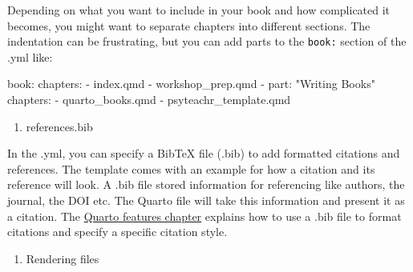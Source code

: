 \documentclass[
  letterpaper,
  DIV=11,
  numbers=noendperiod]{scrreprt}
\newenvironment{Shaded}{\begin{snugshade}}{\end{snugshade}}
\newcommand{\NormalTok}[1]{\textcolor[rgb]{0.00,0.23,0.31}{#1}}
\newcommand{\SpecialCharTok}[1]{\textcolor[rgb]{0.37,0.37,0.37}{#1}}
\newcommand{\StringTok}[1]{\textcolor[rgb]{0.13,0.47,0.30}{#1}}
\providecommand{\tightlist}{%
  \setlength{\itemsep}{0pt}\setlength{\parskip}{0pt}}\usepackage{longtable,booktabs,array}
\begin{document}
\begin{tcolorbox}[enhanced jigsaw, colbacktitle=quarto-callout-tip-color!10!white, titlerule=0mm, leftrule=.75mm, title=\textcolor{quarto-callout-tip-color}{\faLightbulb}\hspace{0.5em}{Tip}, breakable, bottomrule=.15mm, opacitybacktitle=0.6, rightrule=.15mm, opacityback=0, arc=.35mm, colframe=quarto-callout-tip-color-frame, toptitle=1mm, bottomtitle=1mm, toprule=.15mm, left=2mm, colback=white, coltitle=black]

Depending on what you want to include in your book and how complicated
it becomes, you might want to separate chapters into different sections.
The indentation can be frustrating, but you can add parts to the
\texttt{book:} section of the .yml like:

\begin{Shaded}
\begin{Highlighting}[]
\NormalTok{book}\SpecialCharTok{:}
\NormalTok{  chapters}\SpecialCharTok{:}
    \SpecialCharTok{{-}}\NormalTok{ index.qmd}
    \SpecialCharTok{{-}}\NormalTok{ workshop\_prep.qmd}
    \SpecialCharTok{{-}}\NormalTok{ part}\SpecialCharTok{:} \StringTok{"Writing Books"}
\NormalTok{      chapters}\SpecialCharTok{:}
        \SpecialCharTok{{-}}\NormalTok{ quarto\_books.qmd}
        \SpecialCharTok{{-}}\NormalTok{ psyteachr\_template.qmd}
\end{Highlighting}
\end{Shaded}

\end{tcolorbox}

\begin{enumerate}
\def\labelenumi{\arabic{enumi}.}
\setcounter{enumi}{3}
\tightlist
\item
  references.bib
\end{enumerate}

In the .yml, you can specify a BibTeX file (.bib) to add formatted
citations and references. The template comes with an example for how a
citation and its reference will look. A .bib file stored information for
referencing like authors, the journal, the DOI etc. The Quarto file will
take this information and present it as a citation. The
\hyperref[quarto_features]{Quarto features chapter} explains how to use
a .bib file to format citations and specify a specific citation style.

\begin{enumerate}
\def\labelenumi{\arabic{enumi}.}
\setcounter{enumi}{4}
\tightlist
\item
  Rendering files
\end{enumerate}
\end{document}

